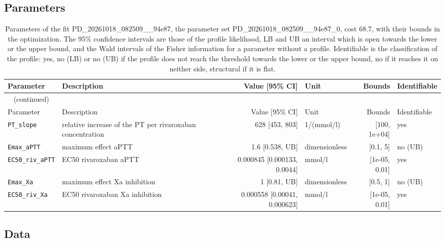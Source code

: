 \documentclass{article}
\begin{document}
\subsection{Parameters}

\begin{longtable}{llrlrl}
\caption{Parameters of the fit PD\_20261018\_082509\_\_94e87, the parameter set PD\_20261018\_082509\_\_94e87\_0, cost 68.7, with their bounds in the optimization. The 95\% confidence intervals are those of the profile likelihood, LB and UB an interval which is open towards the lower or the upper bound, and the Wald intervals of the Fisher information for a parameter without a profile. Identifiable is the classification of the profile: yes, no (LB) or no (UB) if the profile does not reach the threshold towards the lower or the upper bound, no if it reaches it on neither side, structural if it is flat.}\label{tab:parameters:PD_20261018_082509__94e87} \\
\toprule
Parameter & Description & Value [95\% CI] & Unit & Bounds & Identifiable \\
\midrule
\endfirsthead
\multicolumn{6}{l}{\small\tablename~\thetable{} (continued)} \\
\toprule
Parameter & Description & Value [95\% CI] & Unit & Bounds & Identifiable \\
\midrule
\endhead
\bottomrule
\endlastfoot
\texttt{PT\_slope} & relative increase of the PT per rivaroxaban concentration & 628 [453, 803] & 1/(mmol/l) & [100, 1e+04] & yes \\
\texttt{Emax\_aPTT} & maximum effect aPTT & 1.6 [0.538, UB] & dimensionless & [0.1, 5] & no (UB) \\
\texttt{EC50\_riv\_aPTT} & EC50 rivaroxaban aPTT & 0.000845 [0.000133, 0.0044] & mmol/l & [1e-05, 0.01] & yes \\
\texttt{Emax\_Xa} & maximum effect Xa inhibition & 1 [0.81, UB] & dimensionless & [0.5, 1] & no (UB) \\
\texttt{EC50\_riv\_Xa} & EC50 rivaroxaban Xa inhibition & 0.000558 [0.00041, 0.000623] & mmol/l & [1e-05, 0.01] & yes \\
\end{longtable}

\subsection{Data}
\end{document}
